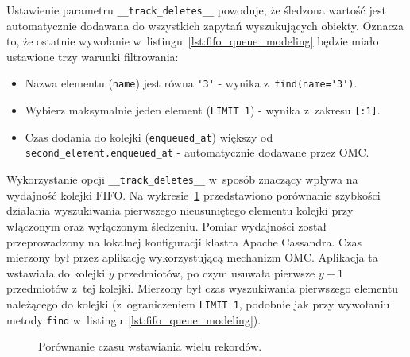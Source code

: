 Ustawienie parametru \verb+__track_deletes__+ powoduje, że śledzona wartość jest automatycznie dodawana do wszystkich zapytań wyszukujących obiekty. Oznacza to, że ostatnie wywołanie w~listingu~\ref{lst:fifo_queue_modeling} będzie miało ustawione trzy warunki filtrowania:

\begin{itemize}
	\item Nazwa elementu (\verb+name+) jest równa \verb+'3'+ - wynika z~\verb+find(name='3')+.
	\item Wybierz maksymalnie jeden element (\verb+LIMIT 1+) - wynika z~zakresu \verb+[:1]+.
	\item Czas dodania do kolejki (\verb+enqueued_at+) większy od \verb+second_element.enqueued_at+ - automatycznie dodawane przez OMC.
\end{itemize}

Wykorzystanie opcji \verb+__track_deletes__+ w~sposób znaczący wpływa na wydajność kolejki FIFO. Na wykresie~\ref{fig:fifo_select_time_comparison} przedstawiono porównanie szybkości działania wyszukiwania pierwszego nieusuniętego elementu kolejki przy włączonym oraz wyłączonym śledzeniu. Pomiar wydajności został przeprowadzony na lokalnej konfiguracji klastra Apache Cassandra. Czas mierzony był przez aplikację wykorzystującą mechanizm OMC. Aplikacja ta wstawiała do kolejki $y$ przedmiotów, po czym usuwała pierwsze $y-1$ przedmiotów z~tej kolejki. Mierzony był czas wyszukiwania pierwszego elementu należącego do kolejki (z~ograniczeniem \verb+LIMIT 1+, podobnie jak przy wywołaniu metody \verb+find+ w~listingu~\ref{lst:fifo_queue_modeling}). 

\begin{figure}
	\centering

	\caption{Porównanie czasu wstawiania wielu rekordów.}
	\label{fig:fifo_select_time_comparison}
\end{figure}


